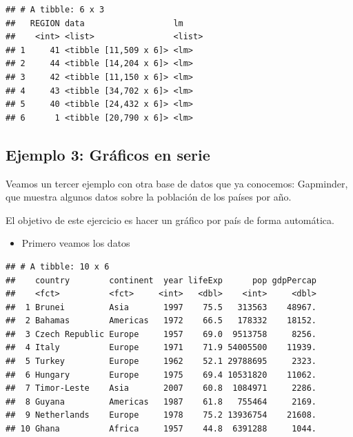 \documentclass[]{book}
\newenvironment{Shaded}{\begin{snugshade}}{\end{snugshade}}
\newcommand{\DecValTok}[1]{\textcolor[rgb]{0.00,0.00,0.81}{#1}}
\newcommand{\KeywordTok}[1]{\textcolor[rgb]{0.13,0.29,0.53}{\textbf{#1}}}
\newcommand{\NormalTok}[1]{#1}
\newcommand{\OperatorTok}[1]{\textcolor[rgb]{0.81,0.36,0.00}{\textbf{#1}}}
\newcommand{\StringTok}[1]{\textcolor[rgb]{0.31,0.60,0.02}{#1}}
\providecommand{\tightlist}{%
  \setlength{\itemsep}{0pt}\setlength{\parskip}{0pt}}
\begin{document}
\begin{verbatim}
## # A tibble: 6 x 3
##   REGION data                  lm    
##    <int> <list>                <list>
## 1     41 <tibble [11,509 x 6]> <lm>  
## 2     44 <tibble [14,204 x 6]> <lm>  
## 3     42 <tibble [11,150 x 6]> <lm>  
## 4     43 <tibble [34,702 x 6]> <lm>  
## 5     40 <tibble [24,432 x 6]> <lm>  
## 6      1 <tibble [20,790 x 6]> <lm>
\end{verbatim}

\hypertarget{ejemplo-3-graficos-en-serie}{%
\subsection{Ejemplo 3: Gráficos en serie}\label{ejemplo-3-graficos-en-serie}}

Veamos un tercer ejemplo con otra base de datos que ya conocemos: Gapminder, que muestra algunos datos sobre la población de los países por año.

El objetivo de este ejercicio es hacer un gráfico por país de forma automática.

\begin{itemize}
\tightlist
\item
  Primero veamos los datos
\end{itemize}

\begin{Shaded}
\end{Shaded}

\begin{verbatim}
## # A tibble: 10 x 6
##    country        continent  year lifeExp      pop gdpPercap
##    <fct>          <fct>     <int>   <dbl>    <int>     <dbl>
##  1 Brunei         Asia       1997    75.5   313563    48967.
##  2 Bahamas        Americas   1972    66.5   178332    18152.
##  3 Czech Republic Europe     1957    69.0  9513758     8256.
##  4 Italy          Europe     1971    71.9 54005500    11939.
##  5 Turkey         Europe     1962    52.1 29788695     2323.
##  6 Hungary        Europe     1975    69.4 10531820    11062.
##  7 Timor-Leste    Asia       2007    60.8  1084971     2286.
##  8 Guyana         Americas   1987    61.8   755464     2169.
##  9 Netherlands    Europe     1978    75.2 13936754    21608.
## 10 Ghana          Africa     1957    44.8  6391288     1044.
\end{verbatim}
\end{document}
